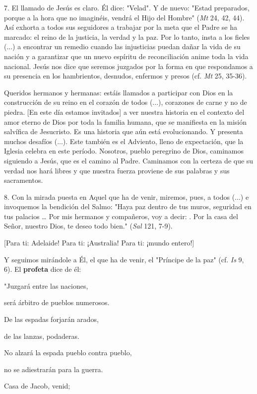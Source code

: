 7. El llamado de Jesús es claro. Él dice: "Velad". Y de nuevo: "Estad
preparados, porque a la hora que no imaginéis, vendrá el Hijo del
Hombre" (\emph{Mt} 24, 42, 44). Así exhorta a todos sus seguidores a
trabajar por la meta que el Padre se ha marcado: el reino de la
justicia, la verdad y la paz. Por lo tanto, insta a los fieles (...) a
encontrar un remedio cuando las injusticias puedan dañar la vida de su
nación y a garantizar que un nuevo espíritu de reconciliación anime toda
la vida nacional. Jesús nos dice que seremos juzgados por la forma en
que respondamos a su presencia en los hambrientos, desnudos, enfermos y
presos (cf. \emph{Mt} 25, 35-36).

Queridos hermanos y hermanas: estáis llamados a participar con Dios en
la construcción de su reino en el corazón de todos (...), corazones de
carne y no de piedra. {[}En este día estamos invitados{]} a ver nuestra
historia en el contexto del amor eterno de Dios por toda la familia
humana, que se manifiesta en la misión salvífica de Jesucristo. Es una
historia que aún está evolucionando. Y presenta muchos desafíos (...).
Este también es el Adviento, lleno de expectación, que la Iglesia
celebra en este período. Nosotros, pueblo peregrino de Dios, caminamos
siguiendo a Jesús, que es el camino al Padre. Caminamos con la certeza
de que su verdad nos hará libres y que nuestra fuerza proviene de sus
palabras y sus sacramentos.

8. Con la mirada puesta en Aquel que ha de venir, miremos, pues, a todos
(...) e invoquemos la bendición del Salmo: "Haya paz dentro de tus
muros, seguridad en tus palacios \ldots{} Por mis hermanos y compañeros,
voy a decir: . Por la casa
del Señor, nuestro Dios, te deseo todo bien." (\emph{Sal} 121, 7-9).

{[}Para ti: Adelaide! Para ti: ¡Australia! Para ti: ¡mundo entero!{]}

Y seguimos mirándole a Él, el que ha de venir, el "Príncipe de la paz"
(cf. \emph{Is} 9, 6). El \textbf{profeta} dice de él:

"Juzgará entre las naciones,

será árbitro de pueblos numerosos.

De las espadas forjarán arados,

de las lanzas, podaderas.

No alzará la espada pueblo contra pueblo,

no se adiestrarán para la guerra.

Casa de Jacob, venid;

